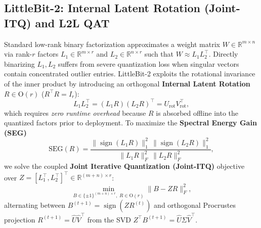 \documentclass[10pt,a4paper]{article}
\begin{document}
\subsection{LittleBit-2: Internal Latent Rotation (Joint-ITQ) and L2L QAT}
Standard low-rank binary factorization approximates a weight matrix $W \in \mathbb{R}^{m \times n}$ via rank-$r$ factors $L_1 \in \mathbb{R}^{m \times r}$ and $L_2 \in \mathbb{R}^{n \times r}$ such that $W \approx L_1 L_2^\top$. Directly binarizing $L_1, L_2$ suffers from severe quantization loss when singular vectors contain concentrated outlier entries. LittleBit-2 exploits the rotational invariance of the inner product by introducing an orthogonal \textbf{Internal Latent Rotation} $R \in \mathrm{O}(r)$ ($R^\top R = I_r$):
\begin{equation}
  L_1 L_2^\top = (L_1 R)(L_2 R)^\top = U_{\mathrm{rot}} V_{\mathrm{rot}}^\top,
\end{equation}
which requires \emph{zero runtime overhead} because $R$ is absorbed offline into the quantized factors prior to deployment. To maximize the \textbf{Spectral Energy Gain (SEG)}
\begin{equation}
  \mathrm{SEG}(R) = \frac{\|\operatorname{sign}(L_1 R)\|_1^2 \, \|\operatorname{sign}(L_2 R)\|_1^2}{\|L_1 R\|_F^2 \, \|L_2 R\|_F^2},
\end{equation}
we solve the coupled \textbf{Joint Iterative Quantization (Joint-ITQ)} objective over $Z = [L_1^\top, L_2^\top]^\top \in \mathbb{R}^{(m+n)\times r}$:
\begin{equation}
  \min_{B \in \{\pm 1\}^{(m+n)\times r},\; R \in \mathrm{O}(r)} \|B - Z R\|_F^2,
\end{equation}
alternating between $B^{(t+1)} = \operatorname{sign}(Z R^{(t)})$ and orthogonal Procrustes projection $R^{(t+1)} = \hat{U}\hat{V}^\top$ from the SVD $Z^\top B^{(t+1)} = \hat{U}\Sigma\hat{V}^\top$.
\end{document}
